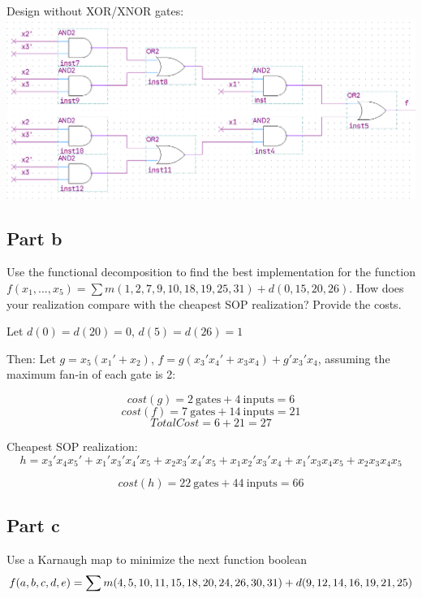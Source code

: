 \documentclass[12pt, a4paper]{article}
\begin{document}
	
	Design without XOR/XNOR gates:\\
	\includegraphics[scale=0.4]{2aNoXOR.png}
	
	
	\subsection*{Part b}
	Use the functional decomposition to find the best implementation for the function $f(x_1, ..., x_5) = \sum{m(1, 2, 7, 9, 10, 18, 19, 25, 31) + d(0, 15, 20, 26)}$. How does your realization compare with the cheapest SOP realization? Provide the costs.

	Let $d(0) = d(20) = 0$, $d(5) = d(26) = 1$

	Then:
	Let $g = x_5(x_1' + x_2)$, $f = g(x_3'x_4' + x_3x_4) + g'x_3'x_4$, assuming the maximum fan-in of each gate is 2:
	
	$$cost(g) = 2\ \text{gates} + 4\ \text{inputs} = 6$$
	$$cost(f) = 7\ \text{gates} + 14\ \text{inputs} = 21$$
	$$TotalCost = 6 + 21 = 27$$
	
	Cheapest SOP realization:
	$$h = x_3'x_4x_5' + x_1'x_3'x_4'x_5 + x_2x_3'x_4'x_5 + x_1x_2'x_3'x_4 + x_1'x_3x_4x_5 + x_2x_3x_4x_5$$

	$$cost(h) = 22\ \text{gates} + 44\ \text{inputs} = 66$$

	\subsection*{Part c}
	Use a Karnaugh map to minimize the next function boolean
	\begin{equation}
	\footnotesize{f(a, b, c, d, e) = {\sum{m(4, 5, 10, 11, 15, 18, 20, 24, 26, 30, 31) + d(9, 12, 14, 16, 19, 21, 25)}}}
	\end{equation}
\end{document}
